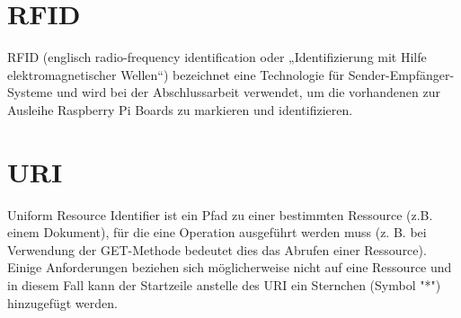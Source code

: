 \section*{RFID}
\label{sec:appendix:rfid}
RFID (englisch radio-frequency identification oder „Identifizierung mit Hilfe elektromagnetischer Wellen“) bezeichnet eine Technologie für Sender-Empfänger-Systeme und wird bei der Abschlussarbeit verwendet, um die vorhandenen zur Ausleihe Raspberry Pi Boards zu markieren und identifizieren.

\section*{URI}
\label{sec:appendix:uri}
Uniform Resource Identifier ist ein Pfad zu einer bestimmten Ressource (z.B.  einem Dokument), für die eine Operation ausgeführt werden muss (z. B. bei Verwendung der GET-Methode bedeutet dies das Abrufen einer Ressource). Einige Anforderungen beziehen sich möglicherweise nicht auf eine Ressource und in diesem Fall kann der Startzeile anstelle des URI ein Sternchen (Symbol "*") hinzugefügt werden.


 